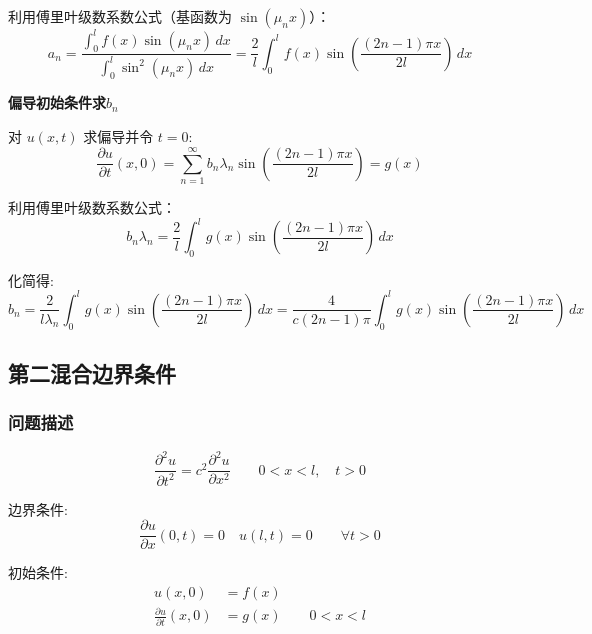 \documentclass[12pt,a4paper]{article}
\numberwithin{subsection}{section}
\numberwithin{subsubsection}{subsection}
\theoremstyle{plain}
\theoremstyle{definition}
\theoremstyle{remark}
\begin{document}
	利用傅里叶级数系数公式（基函数为 $\sin(\mu_n x)$）：
	\begin{equation}
		a_n = \frac{\int_0^l f(x) \sin(\mu_n x) \, dx}{\int_0^l \sin^2(\mu_n x) \, dx} = \frac{2}{l} \int_0^l f(x) \sin\left(\frac{(2n-1)\pi x}{2l}\right) \, dx
	\end{equation}
	
	\noindent
	\textbf{偏导初始条件求$b_n$}
	
	对 $u(x,t)$ 求偏导并令 $t=0$:
	\begin{equation}
		\frac{\partial u}{\partial t}(x, 0) = \sum_{n=1}^{\infty} b_n \lambda_n \sin\left(\frac{(2n-1)\pi x}{2l}\right) = g(x)
	\end{equation}
	
	利用傅里叶级数系数公式：
	\begin{equation}
		b_n \lambda_n = \frac{2}{l} \int_0^l g(x) \sin\left(\frac{(2n-1)\pi x}{2l}\right) \, dx
	\end{equation}
	
	化简得:
	\begin{equation}
		b_n = \frac{2}{l \lambda_n} \int_0^l g(x) \sin\left(\frac{(2n-1)\pi x}{2l}\right) \, dx = \frac{4}{c(2n-1)\pi} \int_0^l g(x) \sin\left(\frac{(2n-1)\pi x}{2l}\right) \, dx
	\end{equation}
	
	\subsection{第二混合边界条件}
	
	\subsubsection{问题描述}
	\begin{equation} \label{eq:wave_equation_mixed2}
		\frac{\partial^2 u}{\partial t^2} = c^2 \frac{\partial^2 u}{\partial x^2} \qquad 0 < x < l, \quad t > 0
	\end{equation}
	
	边界条件:
	\begin{equation} \label{eq:boundary_conditions_mixed2}
		\frac{\partial u}{\partial x}(0, t) = 0 \quad u(l, t) = 0 \qquad \forall t > 0
	\end{equation}
	
	初始条件:
	\begin{equation} \label{eq:initial_conditions_mixed2}
		\begin{aligned}
			u(x, 0) &= f(x) \\
			\frac{\partial u}{\partial t}(x, 0) &= g(x) \qquad 0 < x < l
		\end{aligned}
	\end{equation}
	
\end{document}
